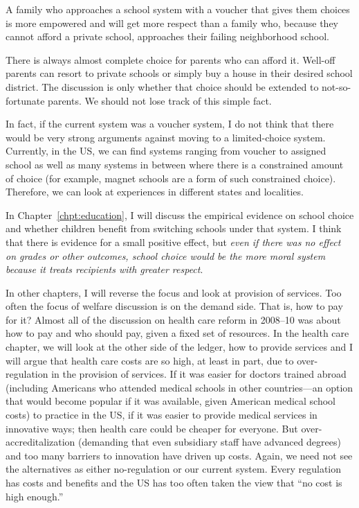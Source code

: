 A family who approaches a school system with a voucher that gives them choices
is more empowered and will get more respect than a family who, because they
cannot afford a private school, approaches their failing neighborhood school.

There is always almost complete choice for parents who can afford it. Well-off
parents can resort to private schools or simply buy a house in their desired
school district. The discussion is only whether that choice should be extended
to not-so-fortunate parents. We should not lose track of this simple fact.

In fact, if the current system was a voucher system, I do not think that there
would be very strong arguments against moving to a limited-choice system.
Currently, in the US, we can find systems ranging from voucher to assigned
school as well as many systems in between where there is a constrained amount of
choice (for example, magnet schools are a form of such constrained choice).
Therefore, we can look at experiences in different states and localities.

In Chapter~\ref{chpt:education}, I will discuss the empirical evidence on
school choice and whether children benefit from switching schools under that
system. I think that there is evidence for a small positive effect, but
\emph{even if there was no effect on grades or other outcomes, school choice
would be the more moral system because it treats recipients with greater
respect}.

In other chapters, I will reverse the focus and look at provision of services.
Too often the focus of welfare discussion is on the demand side. That is, how
to pay for it? Almost all of the discussion on health care reform in 2008--10
was about how to pay and who should pay, given a fixed set of resources. In the
health care chapter, we will look at the other side of the ledger, how to
provide services and I will argue that health care costs are so high, at least
in part, due to over-regulation in the provision of services. If it was easier
for doctors trained abroad (including Americans who attended medical schools in
other countries---an option that would become popular if it was available,
given American medical school costs) to practice in the US, if it was easier to
provide medical services in innovative ways; then health care could be cheaper
for everyone. But over-accreditalization (demanding that even subsidiary staff
have advanced degrees) and too many barriers to innovation have driven up
costs. Again, we need not see the alternatives as either no-regulation or our
current system. Every regulation has costs and benefits and the US has too
often taken the view that ``no cost is high enough.''

